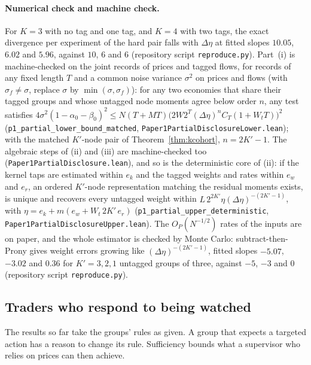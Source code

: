 \documentclass[12pt]{article}
\theoremstyle{definition}
\theoremstyle{remark}
\begin{document}
\paragraph{Numerical check and machine check.} For $K=3$ with no tag and one tag, and $K=4$ with two tags, the exact divergence per experiment of the hard pair falls with $\Delta\eta$ at fitted slopes $10.05$, $6.02$ and $5.96$, against $10$, $6$ and $6$ (repository script \nolinkurl{reproduce.py}). Part~(i) is machine-checked on the joint records of prices and tagged flows, for records of any fixed length $T$ and a common noise variance $\sigma^2$ on prices and flows (with $\sigma_f\ne\sigma$, replace $\sigma$ by $\min(\sigma,\sigma_f)$): for any two economies that share their tagged groups and whose untagged node moments agree below order $n$, any test satisfies $4\sigma^2(1-\alpha_0-\beta_0)^2\le N(T+MT)\bigl(2W2^T(\Delta\eta)^nC_T(1+W_tT)\bigr)^2$ (\texttt{p1\_partial\_lower\_bound\_matched}, \nolinkurl{Paper1PartialDisclosureLower.lean}); with the matched $K'$-node pair of Theorem~\ref{thm:kcohort}, $n=2K'-1$. The algebraic steps of (ii) and (iii) are machine-checked too (\nolinkurl{Paper1PartialDisclosure.lean}), and so is the deterministic core of (ii): if the kernel taps are estimated within $e_k$ and the tagged weights and rates within $e_w$ and $e_r$, an ordered $K'$-node representation matching the residual moments exists, is unique and recovers every untagged weight within $L\,2^{2K'}\eta(\Delta\eta)^{-(2K'-1)}$, with $\eta=e_k+m(e_w+W_t\,2K'\,e_r)$ (\texttt{p1\_partial\_upper\_deterministic}, \nolinkurl{Paper1PartialDisclosureUpper.lean}). The $O_P(N^{-1/2})$ rates of the inputs are on paper, and the whole estimator is checked by Monte Carlo: subtract-then-Prony gives weight errors growing like $(\Delta\eta)^{-(2K'-1)}$, fitted slopes $-5.07$, $-3.02$ and $0.36$ for $K'=3,2,1$ untagged groups of three, against $-5$, $-3$ and $0$ (repository script \nolinkurl{reproduce.py}).

\subsection{Traders who respond to being watched}\label{sec:hiding}

The results so far take the groups' rules as given. A group that expects a targeted action has a reason to change its rule. Sufficiency bounds what a supervisor who relies on prices can then achieve.
\end{document}
